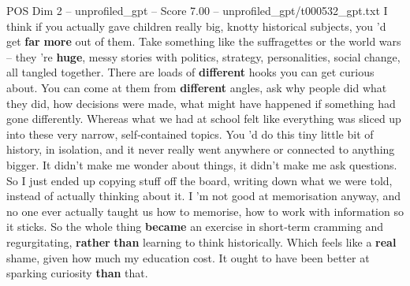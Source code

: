 \begin{textsample}{POS Dim 2 – unprofiled\_gpt – Score 7.00 – unprofiled\_gpt/t000532\_gpt.txt}  \label{ex:f2_pos_028}
I think if you actually gave children really big, knotty historical subjects, you ’d get \textbf{far} \textbf{more} out of them.
Take something like the suffragettes or the world wars – they ’re \textbf{huge}, messy stories with politics, strategy, personalities, social change, all tangled together.
There are loads of \textbf{different} hooks you can get curious about.
You can come at them from \textbf{different} angles, ask why people did what they did, how decisions were made, what might have happened if something had gone differently.
Whereas what we had at school felt like everything was sliced up into these very narrow, self‑contained topics.
You ’d do this tiny little bit of history, in isolation, and it never really went anywhere or connected to anything bigger.
It didn't make me wonder about things, it didn't make me ask questions.
So I just ended up copying stuff off the board, writing down what we were told, instead of actually thinking about it.
I ’m not good at memorisation anyway, and no one ever actually taught us how to memorise, how to work with information so it sticks.
So the whole thing \textbf{became} an exercise in short‑term cramming and regurgitating, \textbf{rather} \textbf{than} learning to think historically.
Which feels like a \textbf{real} shame, given how much my education cost.
It ought to have been better at sparking curiosity \textbf{than} that.

\end{textsample}
